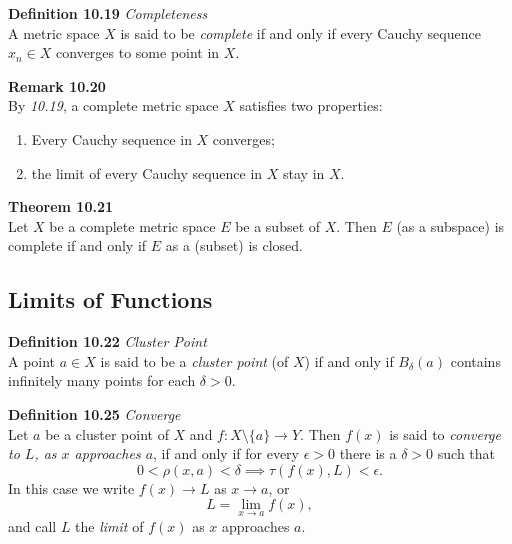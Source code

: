 \documentclass[8pt,landscape]{article}
\begin{document}
\begin{multicols}{3}
\textbf{Definition 10.19} \emph{Completeness} \\
A metric space $X$ is said to be \emph{complete} if and only if every Cauchy sequence
$x_n \in X$ converges to some point in $X$.

\textbf{Remark 10.20} \\
By \emph{10.19}, a complete metric space $X$ satisfies two properties:
\begin{enumerate}
    \item Every Cauchy sequence in $X$ converges;
    \item the limit of every Cauchy sequence in $X$ stay in $X$.
\end{enumerate}

\textbf{Theorem 10.21} \\
Let $X$ be a complete metric space $E$ be a subset of $X$.
Then $E$ (as a subspace) is complete if and only if $E$ as a (subset) is closed.

\subsection{Limits of Functions}

\textbf{Definition 10.22} \emph{Cluster Point} \\
A point $a \in X$ is said to be a \emph{cluster point} (of $X$) if and only if
$B_\delta (a)$ contains infinitely many points for each $\delta > 0$.

\textbf{Definition 10.25} \emph{Converge} \\
Let $a$ be a cluster point of $X$ and $f : X \setminus \{a\} \to Y$.
Then $f(x)$ is said to \emph{converge to $L$, as $x$ approaches $a$},
if and only if for every $\epsilon > 0$ there is a $\delta > 0$ such that
\[
    0 < \rho (x, a) < \delta \implies \tau (f(x), L) < \epsilon.
\]
In this case we write $f(x) \to L$ as $x \to a$, or
\[
    L = \lim_{x \to a} f(x),
\]
and call $L$ the \emph{limit} of $f(x)$ as $x$ approaches $a$.


\end{multicols}
\end{document}
